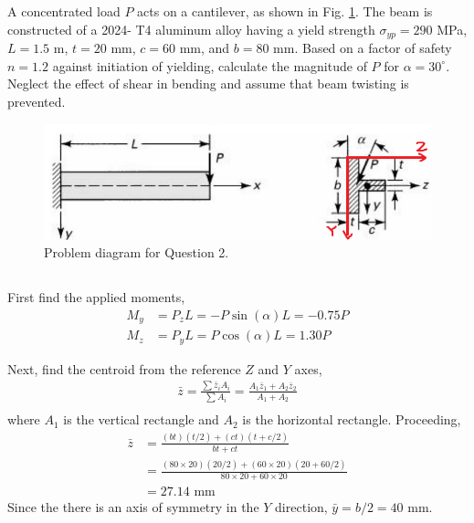 \section{}
A concentrated load $P$ acts on a cantilever, as shown in Fig. \ref{fig:Q2ProblemDiagram}. The beam is constructed of a 2024-
T4 aluminum alloy having a yield strength $\sigma_{yp} = 290$ MPa, $L = 1.5$ m, $t = 20$ mm, $c = 60$ mm,
and $b = 80$ mm. Based on a factor of safety $n = 1.2$ against initiation of yielding, calculate the
magnitude of $P$ for $\alpha = 30^{\circ}$. Neglect the effect of shear in bending and assume that beam twisting
is prevented.
\begin{figure}[h]
    \centering
    \includegraphics[width=0.35\linewidth]{Questions/Figures/Q2ProblemDiagram.png}
    \caption{Problem diagram for Question 2.}
    \label{fig:Q2ProblemDiagram}
\end{figure}

\subsection{}
First find the applied moments,
\begin{align*}
    M_y &= P_z L = -P \sin(\alpha) L  = -0.75P \\
    M_z &= P_y L = P \cos(\alpha) L = 1.30P
\end{align*}

Next, find the centroid from the reference $Z$ and $Y$ axes,
\begin{align*}
    \bar{z} = \frac{\sum \bar{z}_i A_i}{\sum A_i} = \frac{A_1 \bar{z}_1 + A_2 \bar{z}_2}{A_1 + A_2} \\
\end{align*}
where $A_1$ is the vertical rectangle and $A_2$ is the horizontal rectangle. Proceeding,
\begin{align*}
    \bar{z} &= \frac{(bt)(t/2) + (ct)(t+c/2)}{bt + ct} \\
    &= \frac{(80\times20)(20/2) + (60\times20)(20+60/2)}{80\times20 + 60\times20} \\
    &= 27.14 \text{ mm}
\end{align*}
Since the there is an axis of symmetry in the $Y$ direction, $\bar{y} = b/2 = 40$ mm.


